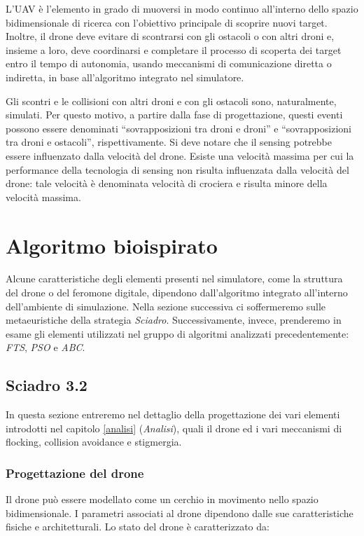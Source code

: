 L'UAV è l'elemento in grado di muoversi in modo continuo all’interno dello spazio bidimensionale di ricerca con l’obiettivo principale di scoprire nuovi target. 
Inoltre, il drone deve evitare di scontrarsi con gli ostacoli o con altri droni e, insieme a loro, deve coordinarsi e completare il processo di scoperta dei target entro il tempo di autonomia, usando meccanismi di comunicazione diretta o indiretta, in base all’algoritmo integrato nel simulatore. 

Gli scontri e le collisioni con altri droni e con gli ostacoli sono, naturalmente, simulati. 
Per questo motivo, a partire dalla fase di progettazione, questi eventi possono essere denominati “sovrapposizioni tra droni e droni” e “sovrapposizioni tra droni e ostacoli”, rispettivamente. 
Si deve notare che il sensing potrebbe essere influenzato dalla velocità del drone. 
Esiste una velocità massima per cui la performance della tecnologia di sensing non risulta influenzata dalla velocità del drone: tale velocità è denominata velocità di crociera e risulta minore della velocità massima.

\section {Algoritmo bioispirato}

Alcune caratteristiche degli elementi presenti nel simulatore, come la struttura del drone o del feromone digitale, dipendono dall'algoritmo integrato all'interno dell'ambiente di simulazione.
Nella sezione successiva ci soffermeremo sulle metaeuristiche della strategia \textit{Sciadro}.
Successivamente, invece, prenderemo in esame gli elementi utilizzati nel gruppo di algoritmi analizzati precedentemente: \textit{FTS}, \textit{PSO} e \textit{ABC}.

\subsection{Sciadro 3.2}

In questa sezione entreremo nel dettaglio della progettazione dei vari elementi introdotti nel capitolo \ref{analisi} (\textit{Analisi}), quali il drone ed i vari meccanismi di flocking, collision avoidance e stigmergia.

\subsubsection{Progettazione del drone}

Il drone può essere modellato come un cerchio in movimento nello spazio bidimensionale. 
I parametri associati al drone dipendono dalle sue caratteristiche fisiche e architetturali. 
Lo stato del drone è caratterizzato da:

